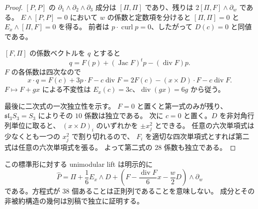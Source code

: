 \begin{proof}
$[P,P]$ の $\partial_1\wedge\partial_2\wedge\partial_3$ 成分は
$[\Pi,\Pi]$ であり、残りは $2[\Pi,F]\wedge\partial_w$ である。
$E\wedge[P,P]=0$ において $w$ の係数と定数項を分けると
$[\Pi,\Pi]=0$ と $E_x\wedge[\Pi,F]=0$ を得る。
前者は $p\cdot\operatorname{curl}p=0$、したがって $D(c)=0$ と同値である。

$[F,\Pi]$ の係数ベクトルを $q$ とすると
\[
 q=F(p)+(\operatorname{Jac}F)^tp-(\operatorname{div}F)p.
\]
$F$ の各係数は四次なので
\[
 x\cdot q=F(c)+3p\cdot F-c\operatorname{div}F
 =2F(c)-(x\times D)\cdot F-c\operatorname{div}F.
\]
$F\mapsto F+gx$ による不変性は
$E_x(c)=3c$、$\operatorname{div}(gx)=6g$ から従う。

最後に二次式の一次独立性を示す。
$F=0$ と置くと第一式のみが残り、
$\mathfrak{sl}_3S_3=S_3$ によりその $10$ 係数は独立である。
次に $c=0$ と置く。$D$ を非対角行列単位に取ると、
$(x\times D)_i$ のいずれかを $\pm x_j^2$ とできる。
任意の六次単項式は少なくとも一つの $x_j^2$ で割り切れるので、
$F_i$ を適切な四次単項式とすれば第二式は任意の六次単項式を張る。
よって第二式の $28$ 係数も独立である。
\end{proof}

この標準形に対する unimodular lift は明示的に
\[
 \widehat P
 =\Pi+\frac16E_x\wedge D
 +\left(F-\frac{\operatorname{div}F}{6}x-\frac w2D\right)
       \wedge\partial_w
\]
である。方程式が $38$ 個あることは正則列であることを意味しない。
成分とその非被約構造の幾何は別稿\cite{VKPoisson32}で独立に証明する。

